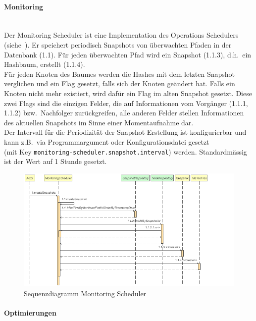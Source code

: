 \documentclass[a4paper,12pt]{report}
\begin{document}
    \paragraph*{Monitoring}
    \\Der Monitoring Scheduler ist eine Implementation des Operations Schedulers (siehe~).
    Er speichert periodisch Snapshots von überwachten Pfaden in der Datenbank (1.1).
    Für jeden überwachten Pfad wird ein Snapshot (1.1.3), d.h.\ ein Hashbaum, erstellt (1.1.4).\\
    Für jeden Knoten des Baumes werden die Hashes mit dem letzten Snapshot verglichen und ein Flag gesetzt, falls sich der Knoten geändert hat.
    Falls ein Knoten nicht mehr existiert, wird dafür ein Flag im alten Snapshot gesetzt.
    Diese zwei Flags sind die einzigen Felder, die auf Informationen vom Vorgänger (1.1.1, 1.1.2) bzw.\ Nachfolger zurückgreifen,
    alle anderen Felder stellen Informationen des aktuellen Snapshots im Sinne einer Momentaufnahme dar.
    \\Der Intervall für die Periodizität der Snapshot-Erstellung ist konfigurierbar und kann z.B.\ via Programmargument oder Konfigurationsdatei gesetzt
    \\(mit Key \texttt{monitoring-scheduler.snapshot.interval}) werden.
    Standardmässig ist der Wert auf 1 Stunde gesetzt.
    \begin{figure}
        \centering
        \includegraphics[width=1\textwidth]{assets/MonitoringScheduler_createSnapshots_seq_diag}
        \caption{Sequenzdiagramm Monitoring Scheduler}
        \label{fig:seq-diag-monitoring-scheduler}
    \end{figure}

    \clearpage

    \paragraph*{Optimierungen}
\end{document}
